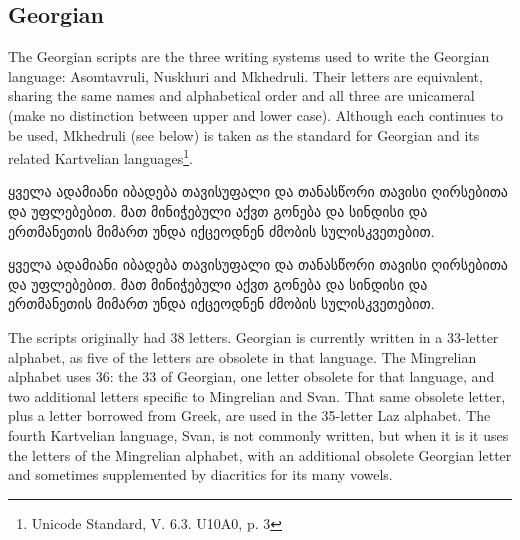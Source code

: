 \subsection{Georgian}

The Georgian scripts are the three writing systems used to write the Georgian language: Asomtavruli, Nuskhuri and Mkhedruli. Their letters are equivalent, sharing the same names and alphabetical order and all three are unicameral (make no distinction between upper and lower case). Although each continues to be used, Mkhedruli (see below) is taken as the standard for Georgian and its related Kartvelian languages\footnote{Unicode Standard, V. 6.3. U10A0, p. 3}. 

\bgroup
\topline

\newfontfamily{}

\newfontfamily{}
\georgian 

\centering
 
ყველა ადამიანი იბადება თავისუფალი და თანასწორი თავისი ღირსებითა და უფლებებით. მათ მინიჭებული აქვთ გონება და სინდისი და ერთმანეთის მიმართ უნდა იქცეოდნენ ძმობის სულისკვეთებით.
\medskip

\georgianarial
ყველა ადამიანი იბადება თავისუფალი და თანასწორი თავისი ღირსებითა და უფლებებით. მათ მინიჭებული აქვთ გონება და სინდისი და ერთმანეთის მიმართ უნდა იქცეოდნენ ძმობის სულისკვეთებით.
\bottomline
{}
\egroup

The scripts originally had 38 letters. Georgian is currently written in a 33-letter alphabet, as five of the letters are obsolete in that language. The Mingrelian alphabet uses 36: the 33 of Georgian, one letter obsolete for that language, and two additional letters specific to Mingrelian and Svan. That same obsolete letter, plus a letter borrowed from Greek, are used in the 35-letter Laz alphabet. The fourth Kartvelian language, Svan, is not commonly written, but when it is it uses the letters of the Mingrelian alphabet, with an additional obsolete Georgian letter and sometimes supplemented by diacritics for its many vowels.